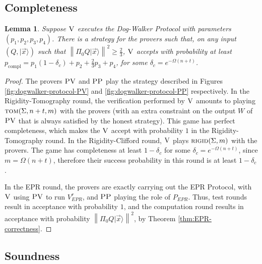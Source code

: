 \documentclass[11pt]{article}
\newtheorem{lemma}[theorem]{Lemma}
\theoremstyle{remark}
\theoremstyle{definition}
\newcommand{\ket}[1]{|#1\rangle}
\newcommand{\norm}[1]{\left\|#1\right\|}
\newcommand{\rigid}{\textsc{rigid}}
\newcommand{\tom}{\textsc{tom}}
\newcommand{\ver}{\textsc{V}}
\newcommand{\pv}{\textsc{PV}}
\newcommand{\pp}{\textsc{PP}}
\begin{document}
\subsection{Completeness}

\begin{lemma}\label{lem:dogwalker-completeness}
Suppose $\ver$ executes the Dog-Walker Protocol with parameters $(p_1,p_2,p_3,p_4)$.
There is a strategy for the provers such that, on any input $(Q,\ket{\vec{x}})$
  such that $\norm{\Pi_0 Q\ket{\vec{x}}}^2\geq \frac{2}{3}$, $\ver$ accepts with
  probability at least
  $p_{\mathrm{compl}}=p_1(1-\delta_c)+p_2+\frac{2}{3}p_3+p_4$, for some $\delta_c = e^{-\Omega(n+t)}$.
\end{lemma}

\begin{proof}
The provers $\pv$ and $\pp$ play the strategy described in Figures
  \ref{fig:dogwalker-protocol-PV} and \ref{fig:dogwalker-protocol-PP}
  respectively. In the Rigidity-Tomography round, the verification performed by
  $\ver$ amounts to playing $\tom(\Sigma,n+t,m)$ with the provers (with an extra
  constraint on the output $W$ of $\pv$ that is always satisfied by the honest
  strategy). This game has perfect
  completeness, which makes the $\ver$
  accept with probability $1$ in the Rigidity-Tomography round.
  In the Rigidity-Clifford round, $\ver$ plays $\rigid(\Sigma,m)$
  with the provers. The game
  has completeness at least $1-\delta_c$ for some $\delta_c=e^{-\Omega(n+t)}$,
  since $m=\Omega(n+t)$, therefore their success probability in this round is
  at least $1-\delta_c$.

In the EPR round, the provers are exactly carrying out the EPR Protocol, with $\ver$ using $\pv$ to run $V_{EPR}^r$, and $\pp$ playing the role of $P_{EPR}$. Thus, test rounds result in acceptance with probability $1$, and the computation round results in acceptance with probability $\norm{\Pi_0 Q\ket{\vec{x}}}^2$, by Theorem \ref{thm:EPR-correctness}. 
\end{proof}


\subsection{Soundness}
\end{document}
